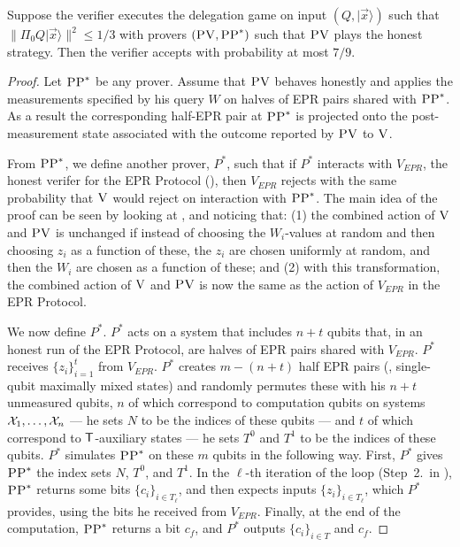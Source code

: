 \documentclass{toc}
\newcommand{\ket}[1]{|#1\rangle}
\newcommand{\ver}{\textsc{V}}
\newcommand{\pv}{\textsc{PV}}
\newcommand{\pp}{\textsc{PP}}
\begin{document}
\begin{lemma}[Soundness against $\pp$]\label{lem:soundness-leash-pp}
Suppose the verifier executes the delegation  game on input $(Q,\ket{\vec{x}})$ such that $\|\Pi_0 Q\ket{\vec{x}}\|^2 \leq 1/3$ with provers $(\pv,\pp^*)$ such that $\pv$ plays the honest strategy. Then the verifier accepts with probability at most $7/9$. 
\end{lemma}

\begin{proof}
Let $\pp^*$ be any prover. Assume that $\pv$ behaves honestly and applies the measurements specified by his query $W$ on halves of EPR pairs shared with $\pp^*$. As a result the corresponding half-EPR pair at $\pp^*$ is projected onto the post-measurement state associated with the outcome reported by $\pv$ to $\ver$. 


From $\pp^*$, we define another prover, $P^*$, such that if $P^*$ interacts with $V_{EPR}$,  the honest verifer for the EPR Protocol (), then $V_{EPR}$ rejects with the same probability that $\ver$ would reject on interaction with $\pp^*$. The main idea of the proof can be seen by looking at , and noticing that: (1) the combined action of $\ver$ and $\pv$ is unchanged if instead of choosing the $W_i$-values at random and then choosing $z_i$ as a function of these, the $z_i$ are chosen uniformly at random, and then the $W_i$ are chosen as a function of these; and (2) with this transformation, the combined action of $\ver$ and $\pv$ is now the same as the action of $V_{EPR}$ in the EPR Protocol. 

We now define $P^*$. $P^*$ acts on a system that includes $n+t$ qubits that, in an honest run of the EPR Protocol, are halves of EPR pairs shared with $V_{EPR}$. $P^*$ receives $\{{z}_i\}_{i=1}^t$ from $V_{EPR}$. $P^*$ creates $m-(n+t)$ half EPR pairs (\ie, single-qubit maximally mixed states) and randomly permutes these with his $n+t$ unmeasured qubits, $n$ of which correspond to computation qubits on systems ${\cal X}_1,\dots,{\cal X}_n$ --- he sets $N$ to be the indices of these qubits --- and $t$ of which correspond to $\sf T$-auxiliary states --- he sets $T^0$ and $T^1$ to be the indices of these qubits. $P^*$ simulates $\pp^*$ on these $m$ qubits in the following way. First, $P^*$ gives $\pp^*$ the index sets $N$, $T^0$, and $T^1$. In the $\ell$-th iteration of the loop (Step~2.\ in ), $\pp^*$ returns some bits $\{c_i\}_{i\in T_\ell}$, and then expects inputs $\{z_i\}_{i\in T_\ell}$, which $P^*$ provides, using the bits he received from $V_{EPR}$. Finally, at the end of the computation, $\pp^*$ returns a bit $c_f$, and $P^*$ outputs $\{c_i\}_{i\in T}$ and ${c_f}$. 


\end{proof}
\end{document}
